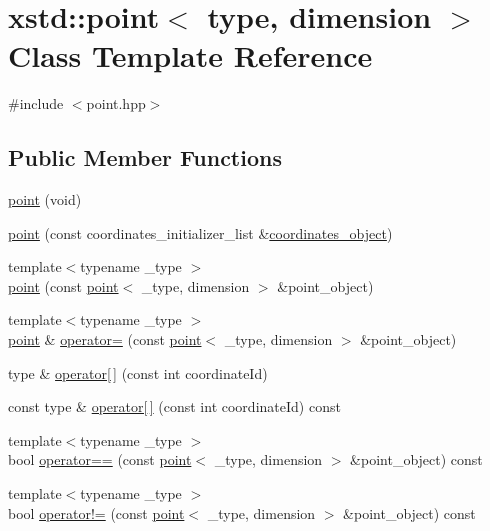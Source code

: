 \hypertarget{classxstd_1_1point}{\section{xstd\-:\-:point$<$ type, dimension $>$ Class Template Reference}
\label{classxstd_1_1point}
}


{\ttfamily \#include $<$point.\-hpp$>$}

\subsection*{Public Member Functions}
\begin{DoxyCompactItemize}
\item 
\hyperlink{classxstd_1_1point_a5a68a9cb37fecabf7ece3933687972e4}{point} (void)
\item 
\hyperlink{classxstd_1_1point_a31b7e462164c6071b3847b0ad0604ef0}{point} (const coordinates\-\_\-initializer\-\_\-list \&\hyperlink{classxstd_1_1point_a6ee0acdc7f3fdd004426279d0d7963e6}{coordinates\-\_\-object})
\item 
{\footnotesize template$<$typename \-\_\-type $>$ }\\\hyperlink{classxstd_1_1point_a3895117f5b9d43c53a8da93528aba6f5}{point} (const \hyperlink{classxstd_1_1point}{point}$<$ \-\_\-type, dimension $>$ \&point\-\_\-object)
\item 
{\footnotesize template$<$typename \-\_\-type $>$ }\\\hyperlink{classxstd_1_1point}{point} \& \hyperlink{classxstd_1_1point_a67d8aba62c4ebe7cf114a276e30336f2}{operator=} (const \hyperlink{classxstd_1_1point}{point}$<$ \-\_\-type, dimension $>$ \&point\-\_\-object)
\item 
type \& \hyperlink{classxstd_1_1point_aaf46d8e0e0676b0fb5e8d86a7742e2a1}{operator\mbox{[}$\,$\mbox{]}} (const int coordinate\-Id)
\item 
const type \& \hyperlink{classxstd_1_1point_a39217029d54ae1c115cc79db3edc1e48}{operator\mbox{[}$\,$\mbox{]}} (const int coordinate\-Id) const 
\item 
{\footnotesize template$<$typename \-\_\-type $>$ }\\bool \hyperlink{classxstd_1_1point_a2f98209745efac5775e14315b58d5a1d}{operator==} (const \hyperlink{classxstd_1_1point}{point}$<$ \-\_\-type, dimension $>$ \&point\-\_\-object) const 
\item 
{\footnotesize template$<$typename \-\_\-type $>$ }\\bool \hyperlink{classxstd_1_1point_a41ffcfd2fbb0420aceb7a3d81950e945}{operator!=} (const \hyperlink{classxstd_1_1point}{point}$<$ \-\_\-type, dimension $>$ \&point\-\_\-object) const 

\end{DoxyCompactItemize}
